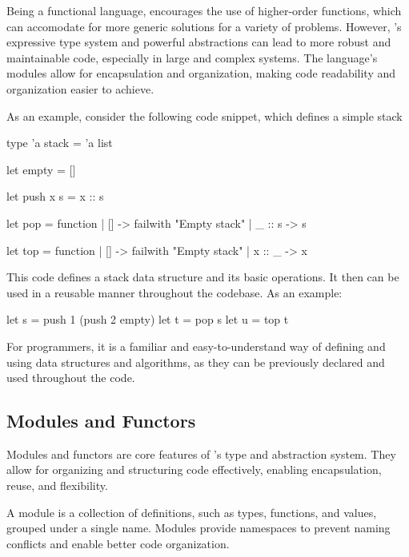 Being a functional language, \ocaml encourages the use of higher-order functions, 
which can accomodate for more generic solutions for a variety of problems. However,
\ocaml's expressive type system and powerful abstractions can lead to more robust
and maintainable code, especially in large and complex systems. The language's 
modules allow for encapsulation and organization, making code readability and organization 
easier to achieve.

As an example, consider the following code snippet, which defines a simple stack

\begin{ocamlenv}
    type 'a stack = 'a list

    let empty = []

    let push x s = x :: s

    let pop = function
        | [] -> failwith "Empty stack"
        | _ :: s -> s

    let top = function
        | [] -> failwith "Empty stack"
        | x :: _ -> x
\end{ocamlenv}

This code defines a stack data structure and its basic operations. It then can be used 
in a reusable manner throughout the codebase. As an example:

\begin{ocamlenv}
    let s = push 1 (push 2 empty)
    let t = pop s
    let u = top t
\end{ocamlenv}


For programmers, it is a familiar and easy-to-understand way of defining and using 
data structures and algorithms, as they can be previously declared and used throughout 
the code.

\subsection{Modules and Functors} %
\label{sub:modules_and_functors}

Modules and functors are core features of \ocaml’s type and abstraction system. 
They allow for organizing and structuring code effectively, enabling encapsulation, 
reuse, and flexibility.

A module is a collection of definitions, such as types, functions, and values, 
grouped under a single name. Modules provide namespaces to prevent naming conflicts 
and enable better code organization.

